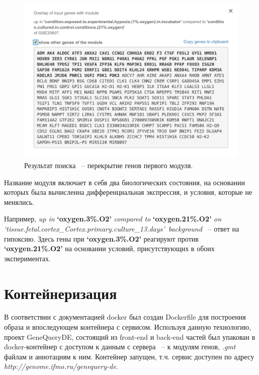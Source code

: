 \documentclass[times,specification,annotation]{itmo-student-thesis}
\begin{document}
\begin{figure}[!h]
    \caption{Результат поиска ~-- перекрытие генов первого модуля.}\label{clientResponseOverlap}
    \centering
    \includegraphics[width=1\textwidth]{overlap}
\end{figure}

Название модуля включает в себя два биологических состояния, на основании которых была вычисленна дифференциальная экспрессия, и условия, которые не менялись.

Например, \textit{up in} \textbf{\lq oxygen.3\%.O2\rq } \textit{compared to} \textbf{\lq oxygen.21\%.O2\rq} \textit{on \lq tissue.fetal.cortex\_Cortex.primary.culture\_13.days\rq~background} ~-- ответ на гипоксию. Здесь гены при \textbf{\lq oxygen.3\%.O2\rq} реагируют против \textbf{\lq oxygen.21\%.O2\rq} на основании условий, присутствующих в обоих экспериментах. 

\section{Контейнеризация}

В соответствии с документацией docker\cite{DockerDock} был создан Dockerfile для построения образа и впоследующем контейнера с сервисом. Используя данную технологию, проект GeneQueryDE, состоящий из front-end и back-end частей был упакован в docker-контейнер с доступом к данным с сервера ~-- к модулям генов, \textit{.gmt} файлам и аннотациям к ним. Контейнер запущен, т.ч. сервис доступен по адресу \textit{http://genome.ifmo.ru/genequery-de}.  

\chapterconclusion
\end{document}

